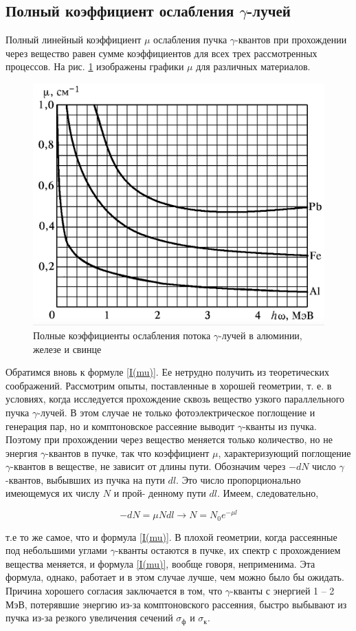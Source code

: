 \documentclass[a4paper, 12pt]{article}%
\begin{document}
	\subsection{Полный коэффициент ослабления $\gamma$-лучей}
	
	Полный линейный коэффициент $ \mu $ ослабления пучка $\gamma$-квантов при прохождении через вещество равен сумме коэффициентов для всех трех рассмотренных процессов. На рис. \ref{ris mu} изображены графики $ \mu $ для различных материалов.
	
	\begin{figure}[h!]
		\centering
		\includegraphics[width=0.6\linewidth]{images/mu.png}
		\caption{Полные коэффициенты ослабления потока $\gamma$-лучей в алюминии, железе и свинце}
		\label{ris mu}
	\end{figure}
	
	
	Обратимся вновь к формуле \eqref{I(mu)}. Ее нетрудно получить из теоретических соображений. Рассмотрим опыты, поставленные в хорошей
	геометрии, т. е. в условиях, когда исследуется прохождение сквозь вещество узкого параллельного пучка $\gamma$-лучей. В этом случае не только
	фотоэлектрическое поглощение и генерация пар, но и комптоновское
	рассеяние выводит $\gamma$-кванты из пучка.
	Поэтому при прохождении через вещество меняется только количество, но не энергия $\gamma$-квантов в пучке, так что коэффициент $ \mu $, характеризующий поглощение $\gamma$-квантов в веществе, не зависит от длины
	пути. Обозначим через $ -dN $ число $\gamma$-квантов, выбывших из пучка на
	пути $ dl $. Это число пропорционально имеющемуся их числу $ N $ и прой-
	денному пути $ dl $. Имеем, следовательно,
	
	\begin{equation}\label{N}
	-dN = \mu N dl \to N = N_0 e^{-\mu l}
	\end{equation}
	
	т.е то же самое, что и формула \eqref{I(mu)}. В плохой геометрии, когда рассеянные под небольшими углами
	$\gamma$-кванты остаются в пучке, их спектр с прохождением вещества меняется, и формула \eqref{I(mu)}, вообще говоря, неприменима. Эта формула, однако, работает и в этом случае лучше, чем можно было бы ожидать. Причина хорошего согласия заключается в том, что $\gamma$-кванты с энергией 1 -- 2 МэВ, потерявшие энергию из-за комптоновского рассеяния,
	быстро выбывают из пучка из-за резкого увеличения сечений $ \sigma_{\text{ф}} $ и $ \sigma_{\text{к}} $.
	
\end{document}
